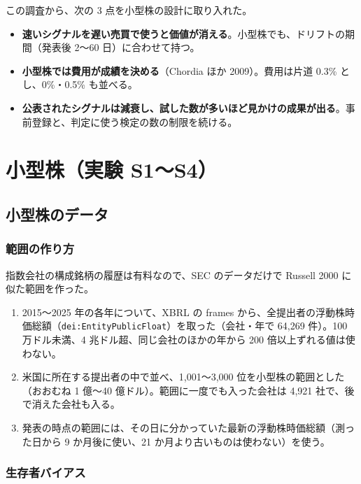 \documentclass[xelatex,ja=standard,jafont=haranoaji,a4paper,10pt]{bxjsreport}
\newcommand{\code}[1]{\texttt{#1}}
\begin{document}
この調査から、次の 3 点を小型株の設計に取り入れた。

\begin{itemize}
\item \textbf{速いシグナルを遅い売買で使うと価値が消える}。小型株でも、ドリフトの期間（発表後 2〜60 日）に合わせて持つ。
\item \textbf{小型株では費用が成績を決める}（Chordia ほか 2009）。費用は片道 0.3\% とし、0\%・0.5\% も並べる。
\item \textbf{公表されたシグナルは減衰し、試した数が多いほど見かけの成果が出る}。事前登録と、判定に使う検定の数の制限を続ける。
\end{itemize}

\part{小型株（実験 S1〜S4）}

\chapter{小型株のデータ}\label{ch:scdata}

\section{範囲の作り方}

指数会社の構成銘柄の履歴は有料なので、SEC のデータだけで Russell 2000 に似た範囲を作った。

\begin{enumerate}
\item 2015〜2025 年の各年について、XBRL の frames から、全提出者の浮動株時価総額（\code{dei:}\allowbreak\code{EntityPublicFloat}）を取った（会社・年で 64,269 件）。100 万ドル未満、4 兆ドル超、同じ会社のほかの年から 200 倍以上ずれる値は使わない。
\item 米国に所在する提出者の中で並べ、1,001〜3,000 位を小型株の範囲とした（おおむね 1 億〜40 億ドル）。範囲に一度でも入った会社は 4,921 社で、後で消えた会社も入る。
\item 発表の時点の範囲には、その日に分かっていた最新の浮動株時価総額（測った日から 9 か月後に使い、21 か月より古いものは使わない）を使う。
\end{enumerate}

\section{生存者バイアス}
\end{document}
